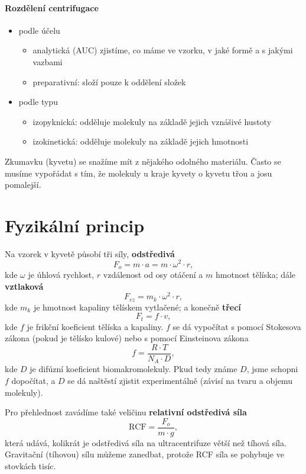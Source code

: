 \documentclass[DIV=8]{scrreprt}
\begin{document}
\paragraph{Rozdělení centrifugace}
\begin{itemize}[nosep]
    \item podle účelu
\begin{itemize}[nosep]
    \item analytická (AUC) zjistíme, co máme ve vzorku, v jaké formě a s jakými vazbami
    \item preparativní: složí pouze k oddělení složek
\end{itemize}

    \item podle typu
\begin{itemize}[nosep]
    \item izopyknická: odděluje molekuly na základě jejich vznášivé hustoty
    \item izokinetická: odděluje molekuly na základě jejich hmotnosti
\end{itemize}

\end{itemize}



Zkumavku (kyvetu) se snažíme mít z nějakého odolného materiálu. Často se musíme vypořádat s tím, že molekuly u kraje kyvety o kyvetu třou a josu pomalejší.

\section{Fyzikální princip} \label{Fyzikální princip}


Na vzorek v kyvetě působí tři síly, \textbf{odstředivá}
\[F_o = m \cdot a = m \cdot \omega^2 \cdot r,\]
kde \(\omega\) je úhlová rychlost, \(r\) vzdálenost od osy otáčení a \(m\) hmotnost tělíska; dále \textbf{vztlaková}
\[F_{vz} = m_k \cdot \omega^2 \cdot r,\]
kde \(m_k\) je hmotnost kapaliny tělískem vytlačené; a konečně \textbf{třecí}
\[F_t = f \cdot v,\]
kde \(f\) je frikční koeficient tělíska a kapaliny. \(f\) se dá vypočítat s pomocí Stokesova zákona (pokud je tělísko kulové) nebo s pomocí Einsteinova zákona
\[f = \frac{R \cdot T}{N_A \cdot D},\]
kde \(D\) je difúzní koeficient biomakromolekuly. Pkud tedy známe \(D\), jsme schopni \(f\) dopočítat, a \(D\) se dá naštěstí zjistit experimentálně (závisí na tvaru a objemu molekuly).

Pro přehlednost zavádíme také veličinu \textbf{relativní odstředivá síla}
\[\text{RCF} = \frac{F_o}{m \cdot g},\]
která udává, kolikrát je odstředivá síla na ultracentrifuze větší než tíhová síla. Gravitační (tíhovou) sílu můžeme zanedbat, protože RCF síla se pohybuje ve stovkách tisíc.
\end{document}
